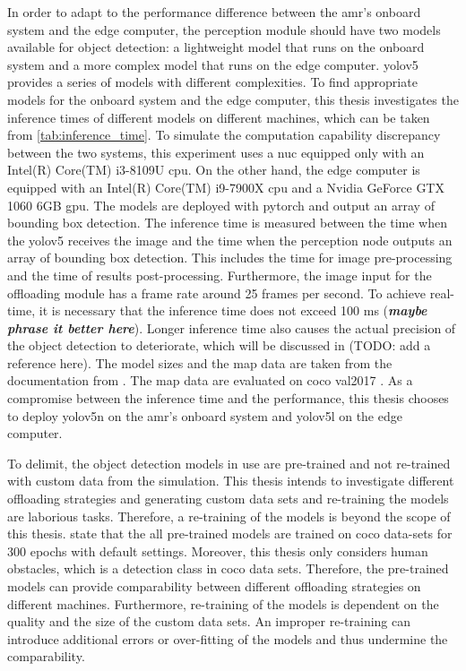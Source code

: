 In order to adapt to the performance difference between the \gls{amr}'s onboard system and the edge computer, the perception module should have two models available for object detection: a lightweight model that runs on the onboard system and a more complex model that runs on the edge computer. \gls{yolov5} provides a series of models with different complexities. To find appropriate models for the onboard system and the edge computer, this thesis investigates the inference times of different models on different machines, which can be taken from \cref{tab:inference_time}. To simulate the computation capability discrepancy between the two systems, this experiment uses a \gls{nuc} equipped only with an Intel(R) Core(TM) i3-8109U \gls{cpu}. On the other hand, the edge computer is equipped with an Intel(R) Core(TM) i9-7900X \gls{cpu} and a Nvidia GeForce GTX 1060 6GB \gls{gpu}. The models are deployed with \gls{pytorch} and output an array of bounding box detection. The inference time is measured between the time when the \gls{yolov5} receives the image and the time when the perception node outputs an array of bounding box detection. This includes the time for image pre-processing and the time of results post-processing. Furthermore, the image input for the offloading module has a frame rate around 25 frames per second. To achieve real-time, it is necessary that the inference time does not exceed 100 ms (\textbf{\textit{maybe phrase it better here}}). Longer inference time also causes the actual precision of the object detection to deteriorate, which will be discussed in (TODO: add a reference here). The model sizes and the \gls{map} data are taken from the documentation from \citeauthor*{Jocher2022} \cite{Jocher2022}. The \gls{map} data are evaluated on \gls{coco} val2017 \cite{Lin2014}. As a compromise between the inference time and the performance, this thesis chooses to deploy \gls{yolov5}n on the \gls{amr}'s onboard system and \gls{yolov5}l on the edge computer. 

To delimit, the object detection models in use are pre-trained and not re-trained with custom data from the simulation. This thesis intends to investigate different offloading strategies and generating custom data sets and re-training the models are laborious tasks. Therefore, a re-training of the models is beyond the scope of this thesis. \citeauthor*{Jocher2022} \cite{Jocher2022} state that the all pre-trained models are trained on \gls{coco} data-sets for 300 epochs with default settings. Moreover, this thesis only considers human obstacles, which is a detection class in \gls{coco} data sets. Therefore, the pre-trained models can provide comparability between different offloading strategies on different machines. Furthermore, re-training of the models is dependent on the quality and the size of the custom data sets. An improper re-training can introduce additional errors or over-fitting of the models and thus undermine the comparability. 

